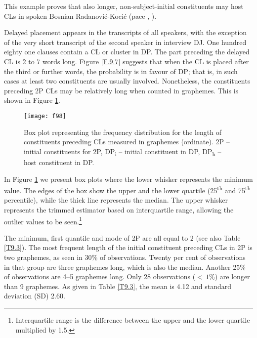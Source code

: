\noindent This example proves that also longer, non-subject-initial constituents may host CLs in spoken Bosnian Radanović-Kocić (pace \citealt[108ff]{RadanovicKocic88}, \citeyear[435]{RadanovicKocic96}).

Delayed placement appears in the transcripts of all speakers, with the exception of the very short transcript of the second speaker in interview DJ. One hundred eighty one clauses contain a CL or cluster in DP. The part preceding the delayed CL is 2 to 7 words long. Figure \ref{F.9.7} suggests that when the CL is placed after the third or further words, the probability is in favour of DP; that is, in such cases at least two constituents are usually involved. Nonetheless, the constituents preceding 2P CLs may be relatively long when counted in graphemes. This is shown in Figure \ref{F.9.8}.

\begin{figure}
\caption{Box plot representing the frequency distribution for the length of constituents preceding CLs measured in graphemes (ordinate). 2P – initial constituents for 2P, DP\textsubscript{i} – initial constituent in DP, DP\textsubscript{h} – host constituent in DP. }
\label{F.9.8}
\texttt{[image: f98]}
\end{figure}

In Figure \ref{F.9.8} we present box plots where the lower whisker represents the minimum value. The edges of the box show the upper and the lower quartile (25\textsuperscript{th} and 75\textsuperscript{th} percentile), while the thick line represents the median. The upper whisker represents the trimmed estimator based on interquartile range, allowing the outlier values to be seen.\footnote{Interquartile range is the difference between the upper and the lower quartile multiplied by 1.5.}

The minimum, first quantile and mode of 2P are all equal to 2 (see also Table \ref{T9.3}). The most frequent length of the initial constituent preceding CLs in 2P is two graphemes, as seen in 30\% of observations. Twenty per cent of observations in that group are three graphemes long, which is also the median. Another 25\% of observations are 4--5 graphemes long. Only 28 observations ($<\,1\%$) are longer than 9 graphemes. As given in Table \ref{T9.3}, the mean is 4.12 and standard deviation (SD) 2.60.

